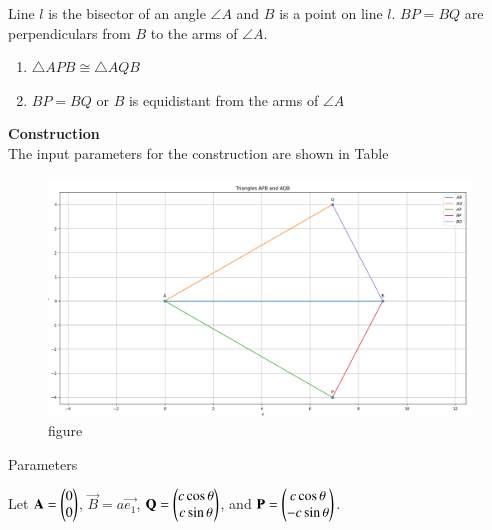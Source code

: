 
\item Line $l$ is the bisector of an angle $\angle{A}$ and $B$ is a point on line $l$. $BP = BQ$ are perpendiculars from $B$ to the arms of $\angle{A}$. 
\begin{enumerate}
\item $\triangle{APB} \cong \triangle{AQB}$
\item $BP = BQ$ or $B$ is equidistant from the arms of $\angle{A}$
\end{enumerate}

\textbf{Construction}\\
The input parameters for the construction are shown in Table 
\begin{figure}[H]
    \begin{center}
     \includegraphics[width=\columnwidth]{chapters/9/7/1/5/figs/tri.png}
    \caption{figure}
    \label{fig:chapters/9/7/1/5/figs/tri.png}   
    \end{center}
\end{figure}

\begin{table}[h]
	  \centering
	  
	  \caption{Parameters}
	  \label{Table}
\end{table}

Let $\mathbf{A} = \begin{pmatrix}0\\0\end{pmatrix}$, $\vec{B} = a\vec{e_1}$, $\mathbf{Q} = \begin{pmatrix}c\cos\theta\\c\sin\theta\end{pmatrix}$, and $\mathbf{P} = \begin{pmatrix}c\cos\theta\\-c\sin\theta\end{pmatrix}$.

